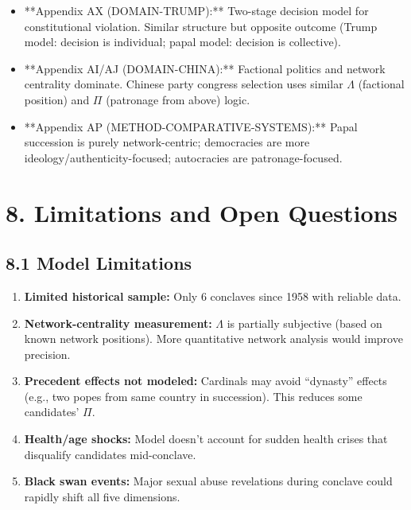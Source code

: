 \documentclass[11pt]{article}
\begin{document}
\begin{itemize}
\item **Appendix AX (DOMAIN-TRUMP):** Two-stage decision model for constitutional violation. Similar structure but opposite outcome (Trump model: decision is individual; papal model: decision is collective).

\item **Appendix AI/AJ (DOMAIN-CHINA):** Factional politics and network centrality dominate. Chinese party congress selection uses similar $\Lambda$ (factional position) and $\Pi$ (patronage from above) logic.

\item **Appendix AP (METHOD-COMPARATIVE-SYSTEMS):** Papal succession is purely network-centric; democracies are more ideology/authenticity-focused; autocracies are patronage-focused.
\end{itemize}

\section{8. Limitations and Open Questions}

\subsection{8.1 Model Limitations}

\begin{enumerate}
\item \textbf{Limited historical sample:} Only 6 conclaves since 1958 with reliable data.

\item \textbf{Network-centrality measurement:} $\Lambda$ is partially subjective (based on known network positions). More quantitative network analysis would improve precision.

\item \textbf{Precedent effects not modeled:} Cardinals may avoid ``dynasty'' effects (e.g., two popes from same country in succession). This reduces some candidates' $\Pi$.

\item \textbf{Health/age shocks:} Model doesn't account for sudden health crises that disqualify candidates mid-conclave.

\item \textbf{Black swan events:} Major sexual abuse revelations during conclave could rapidly shift all five dimensions.
\end{enumerate}
\end{document}
